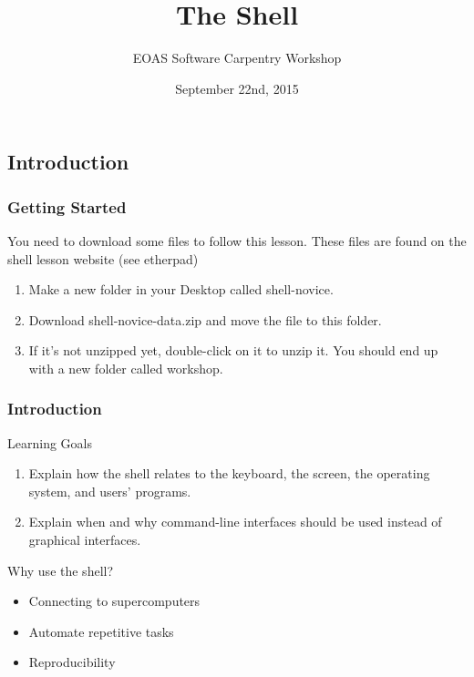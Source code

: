 \documentclass{beamer}
\title[Shell Lesson]{The Shell}
\subtitle[]{EOAS Software Carpentry Workshop }
\date[Sep 2015]{September 22nd, 2015}
\begin{document}





 
\begin{frame}[plain]
  
\titlepage


\end{frame}




\subsection*{Introduction}

\begin{frame}
\frametitle{Getting Started}

You need to download some files to follow this lesson. These files are found on the shell lesson website (see etherpad)

\begin{enumerate}
\item Make a new folder in your Desktop called shell-novice.
\item Download shell-novice-data.zip and move the file to this folder.
\item If it's not unzipped yet, double-click on it to unzip it. You should end up with a new folder called workshop.
\end{enumerate}
\end{frame}


\begin{frame}
\frametitle{Introduction}
\begin{block}{Learning Goals}
\begin{enumerate}

 \item   Explain how the shell relates to the keyboard, the screen, the operating system, and users' programs.
 \item   Explain when and why command-line interfaces should be used instead of graphical interfaces.

\end{enumerate}
\end{block}
\pause
\begin{block}{Why use the shell?}
\begin{itemize}
\pause
\item Connecting to supercomputers
\pause
\item Automate repetitive tasks
\pause
\item Reproducibility 
\end{itemize}
\end{block}
\end{frame}
\end{document}
